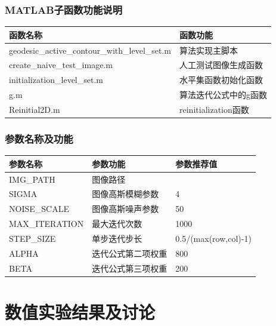 \documentclass[a4paper, UTF8]{ctexrep}
\begin{document}
		\subsubsection{MATLAB子函数功能说明} %
		\label{ssub:matlab子函数功能说明}
			\begin{table}[htbp!]
				\centering
				\begin{tabular}{ll}
					\hline
					函数名称 & 函数功能 \\
					\hline
					geodesic\_active\_contour\_with\_level\_set.m & 算法实现主脚本 \\
					create\_naive\_test\_image.m & 人工测试图像生成函数 \\
					initialization\_level\_set.m & 水平集函数初始化函数 \\
					g.m & 算法迭代公式中的g函数 \\
					Reinitial2D.m & reinitialization函数 \\
					\hline
				\end{tabular}
			\end{table}
		
		\subsubsection{参数名称及功能} %
		\label{ssub:参数名称及功能}
			\begin{table}[htbp!]
				\centering
				\begin{tabular}{lll}
					\hline
					参数名称 & 参数功能 & 参数推荐值 \\
					\hline
					IMG\_PATH & 图像路径 & 　　\\
					SIGMA & 图像高斯模糊参数 & 4 \\
					NOISE\_SCALE & 图像高斯噪声参数 & 50 \\
					MAX\_ITERATION & 最大迭代次数 & 1000 \\
					STEP\_SIZE & 单步迭代步长 & 0.5/(max(row,col)-1) \\
					ALPHA & 迭代公式第二项权重 & 800 \\
					BETA & 迭代公式第三项权重 & 200 \\
					\hline
				\end{tabular}
			\end{table}
		
	\section{数值实验结果及讨论} %
	\label{sec:数值实验结果及讨论}
\end{document}

